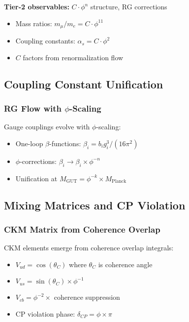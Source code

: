 \documentclass[11pt]{article}
\theoremstyle{definition}
\newcommand{\goldenratio}{\phi}
\begin{document}
\textbf{Tier-2 observables:} $C \cdot \goldenratio^n$ structure, RG corrections
\begin{itemize}
\item Mass ratios: $m_\mu/m_e = C \cdot \goldenratio^{11}$
\item Coupling constants: $\alpha_s = C \cdot \goldenratio^2$
\item $C$ factors from renormalization flow
\end{itemize}

\subsection{Coupling Constant Unification}

\subsubsection{RG Flow with $\goldenratio$-Scaling}

Gauge couplings evolve with $\goldenratio$-scaling:
\begin{itemize}
\item One-loop $\beta$-functions: $\beta_i = b_i g_i^3/(16\pi^2)$
\item $\goldenratio$-corrections: $\beta_i \to \beta_i \times \goldenratio^{-n}$
\item Unification at $M_{\text{GUT}} = \goldenratio^{-k} \times M_{\text{Planck}}$
\end{itemize}

\subsection{Mixing Matrices and CP Violation}

\subsubsection{CKM Matrix from Coherence Overlap}

CKM elements emerge from coherence overlap integrals:
\begin{itemize}
\item $V_{ud} = \cos(\theta_C)$ where $\theta_C$ is coherence angle
\item $V_{us} = \sin(\theta_C) \times \goldenratio^{-1}$
\item $V_{cb} = \goldenratio^{-2} \times$ coherence suppression
\item CP violation phase: $\delta_{CP} = \goldenratio \times \pi$
\end{itemize}
\end{document}
